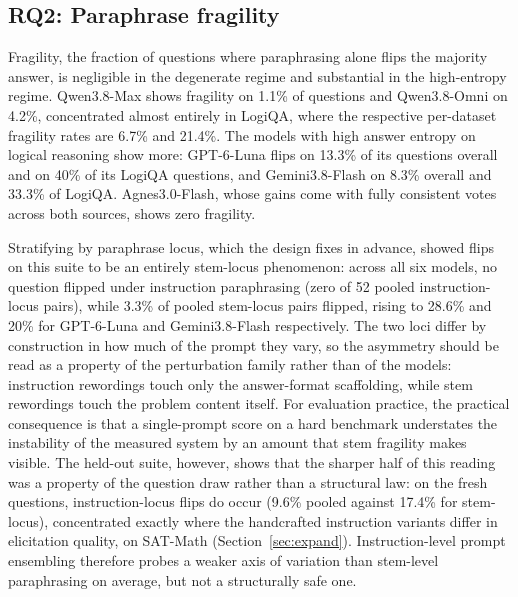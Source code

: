 \subsection{RQ2: Paraphrase fragility}
\label{sec:rq2}

Fragility, the fraction of questions where paraphrasing alone flips the majority answer, is negligible in the degenerate regime and substantial in the high-entropy regime. Qwen3.8-Max shows fragility on 1.1\% of questions and Qwen3.8-Omni on 4.2\%, concentrated almost entirely in LogiQA, where the respective per-dataset fragility rates are 6.7\% and 21.4\%. The models with high answer entropy on logical reasoning show more: GPT-6-Luna flips on 13.3\% of its questions overall and on 40\% of its LogiQA questions, and Gemini3.8-Flash on 8.3\% overall and 33.3\% of LogiQA. Agnes3.0-Flash, whose gains come with fully consistent votes across both sources, shows zero fragility.

Stratifying by paraphrase locus, which the design fixes in advance, showed flips on this suite to be an entirely stem-locus phenomenon: across all six models, no question flipped under instruction paraphrasing (zero of 52 pooled instruction-locus pairs), while 3.3\% of pooled stem-locus pairs flipped, rising to 28.6\% and 20\% for GPT-6-Luna and Gemini3.8-Flash respectively. The two loci differ by construction in how much of the prompt they vary, so the asymmetry should be read as a property of the perturbation family rather than of the models: instruction rewordings touch only the answer-format scaffolding, while stem rewordings touch the problem content itself. For evaluation practice, the practical consequence is that a single-prompt score on a hard benchmark understates the instability of the measured system by an amount that stem fragility makes visible. The held-out suite, however, shows that the sharper half of this reading was a property of the question draw rather than a structural law: on the fresh questions, instruction-locus flips do occur (9.6\% pooled against 17.4\% for stem-locus), concentrated exactly where the handcrafted instruction variants differ in elicitation quality, on SAT-Math (Section~\ref{sec:expand}). Instruction-level prompt ensembling therefore probes a weaker axis of variation than stem-level paraphrasing on average, but not a structurally safe one.

